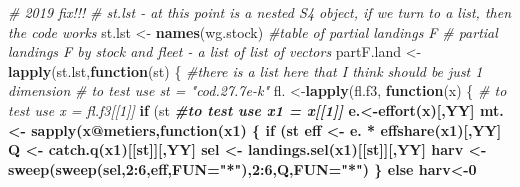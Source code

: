\documentclass[
]{article}
\newenvironment{Shaded}{\begin{snugshade}}{\end{snugshade}}
\newcommand{\CommentTok}[1]{\textcolor[rgb]{0.56,0.35,0.01}{\textit{#1}}}
\newcommand{\ControlFlowTok}[1]{\textcolor[rgb]{0.13,0.29,0.53}{\textbf{#1}}}
\newcommand{\DataTypeTok}[1]{\textcolor[rgb]{0.13,0.29,0.53}{#1}}
\newcommand{\DecValTok}[1]{\textcolor[rgb]{0.00,0.00,0.81}{#1}}
\newcommand{\KeywordTok}[1]{\textcolor[rgb]{0.13,0.29,0.53}{\textbf{#1}}}
\newcommand{\NormalTok}[1]{#1}
\newcommand{\OperatorTok}[1]{\textcolor[rgb]{0.81,0.36,0.00}{\textbf{#1}}}
\newcommand{\StringTok}[1]{\textcolor[rgb]{0.31,0.60,0.02}{#1}}
\begin{document}
\begin{Shaded}
\begin{Highlighting}[]
{            \CommentTok{# 2019 fix!!!}
            \CommentTok{# st.lst - at this point is a nested S4 object, if we turn to a list, then the code works}
\NormalTok{            st.lst <-}\StringTok{ }\KeywordTok{names}\NormalTok{(wg.stock)}
            \CommentTok{#table of partial landings F}
            \CommentTok{# partial landings F by stock and fleet - a list of list of vectors}
\NormalTok{            partF.land <-}\StringTok{ }\KeywordTok{lapply}\NormalTok{(st.lst,}\ControlFlowTok{function}\NormalTok{(st) \{ }\CommentTok{#there is a list here that I think should be just 1 dimension}
              \CommentTok{# to test use st = "cod.27.7e-k"}
\NormalTok{                                        fl. <-}\KeywordTok{lapply}\NormalTok{(fl.f3, }\ControlFlowTok{function}\NormalTok{(x) \{}
                                          \CommentTok{# to test use x = fl.f3[[1]]}
                                     \ControlFlowTok{if}\NormalTok{ (st }\OperatorTok{%in%}\StringTok{ }\KeywordTok{unique}\NormalTok{(}\KeywordTok{unlist}\NormalTok{(}\KeywordTok{lapply}\NormalTok{(x}\OperatorTok{@}\NormalTok{metiers, }\ControlFlowTok{function}\NormalTok{(x1) }\KeywordTok{names}\NormalTok{(x1}\OperatorTok{@}\NormalTok{catches))))) \{}
                                       \CommentTok{#to test use x1 = x[[1]]}
\NormalTok{                                        e.<-}\KeywordTok{effort}\NormalTok{(x)[,YY]}
\NormalTok{                                        mt. <-}\StringTok{ }\KeywordTok{sapply}\NormalTok{(x}\OperatorTok{@}\NormalTok{metiers,}\ControlFlowTok{function}\NormalTok{(x1) \{}
                                        \ControlFlowTok{if}\NormalTok{ (st }\OperatorTok{%in%}\StringTok{ }\KeywordTok{names}\NormalTok{(x1}\OperatorTok{@}\NormalTok{catches)) \{}
\NormalTok{                                            eff <-}\StringTok{ }\NormalTok{e. }\OperatorTok{*}\StringTok{ }\KeywordTok{effshare}\NormalTok{(x1)[,YY]}
\NormalTok{                                            Q   <-}\StringTok{ }\KeywordTok{catch.q}\NormalTok{(x1)[[st]][,YY]}
\NormalTok{                                            sel <-}\StringTok{ }\KeywordTok{landings.sel}\NormalTok{(x1)[[st]][,YY]}
\NormalTok{                                            harv <-}\StringTok{ }\KeywordTok{sweep}\NormalTok{(}\KeywordTok{sweep}\NormalTok{(sel,}\DecValTok{2}\OperatorTok{:}\DecValTok{6}\NormalTok{,eff,}\DataTypeTok{FUN=}\StringTok{"*"}\NormalTok{),}\DecValTok{2}\OperatorTok{:}\DecValTok{6}\NormalTok{,Q,}\DataTypeTok{FUN=}\StringTok{"*"}\NormalTok{)}
\NormalTok{                                        \} }\ControlFlowTok{else}\NormalTok{  harv<-}\DecValTok{0}
}}}
\end{Highlighting}
\end{Shaded}
\end{document}
